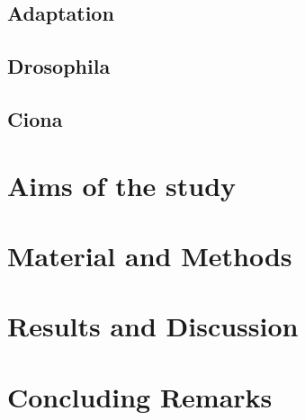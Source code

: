 \documentclass[officiallayout]{tktla_modified}
\begin{document}
\section{Adaptation}
	
	\clearpage
\section{Drosophila}
	
	\clearpage
\section{Ciona}
	
	\clearpage

\chapter{Aims of the study}



\chapter{Material and Methods}



\chapter{Results and Discussion}




\chapter{Concluding Remarks}



\listoffigures

%


\end{document}

